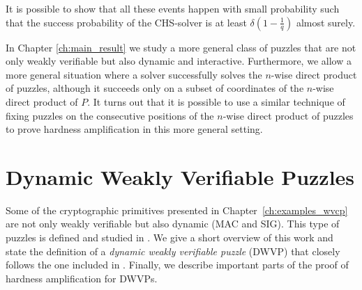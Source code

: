It is possible to show that all these events happen with small probability such that
the success probability of the CHS-solver is at least $\delta(1\!-\!\frac{1}{q})$ almost surely.

In Chapter \ref{ch:main_result} we study a more general class of puzzles that are not only weakly verifiable but also dynamic and interactive.
Furthermore, we allow a more general situation where a solver successfully solves the $n$-wise direct product of puzzles,
although it succeeds only on a subset of coordinates of the $n$-wise direct product of $P$.
It turns out that it is possible to use a similar technique of fixing puzzles on the consecutive positions of the $n$-wise direct product of
puzzles to prove hardness amplification in this more general setting.
%
\section{Dynamic Weakly Verifiable Puzzles}
\label{section:dijk}
Some of the cryptographic primitives presented in Chapter~\ref{ch:examples_wvcp}
are not only weakly verifiable but also dynamic (MAC and SIG). This type of puzzles is defined and studied in \cite{dodis2009security}.
We give a short overview of this work and state the definition of a \textit{dynamic weakly verifiable puzzle} (DWVP) that closely follows
the one included in \cite{dodis2009security}.
Finally, we describe important parts of the proof of hardness amplification for DWVPs.

